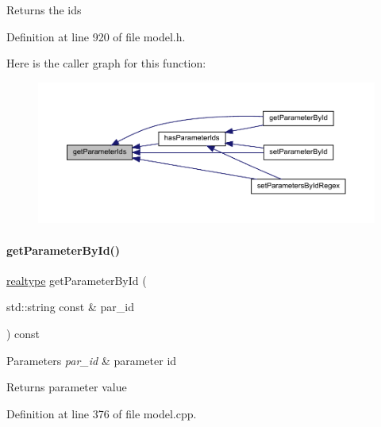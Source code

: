 \begin{DoxyReturn}{Returns}
the ids 
\end{DoxyReturn}


Definition at line 920 of file model.\+h.

Here is the caller graph for this function\+:
\nopagebreak
\begin{figure}[H]
\begin{center}
\leavevmode
\includegraphics[width=350pt]{classamici_1_1_model_ad5647cbe7c4989a7692955cbdbf5b3cd_icgraph}
\end{center}
\end{figure}
\mbox{\label{classamici_1_1_model_a4436bd89ae2cb032cbf13db478d99e15}} 
\paragraph{\texorpdfstring{get\+Parameter\+By\+Id()}{getParameterById()}}
{\footnotesize\ttfamily \mbox{\hyperlink{namespaceamici_a1bdce28051d6a53868f7ccbf5f2c14a3}{realtype}} get\+Parameter\+By\+Id (\begin{DoxyParamCaption}\item[{std\+::string const \&}]{par\+\_\+id }\end{DoxyParamCaption}) const}


\begin{DoxyParams}{Parameters}
{\em par\+\_\+id} & parameter id \\
\hline
\end{DoxyParams}
\begin{DoxyReturn}{Returns}
parameter value 
\end{DoxyReturn}


Definition at line 376 of file model.\+cpp.


